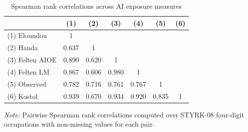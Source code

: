 \begin{table}[htbp]
\centering
\caption{Spearman rank correlations across AI exposure measures}
\label{tab:correlations}
\begin{tabular}{lcccccc}
\toprule
 & (1) & (2) & (3) & (4) & (5) & (6) \\
\midrule
(1) Eloundou & 1 &  &  &  &  &  \\
(2) Handa & 0.637 & 1 &  &  &  &  \\
(3) Felten AIOE & 0.890 & 0.620 & 1 &  &  &  \\
(4) Felten LM & 0.867 & 0.606 & 0.980 & 1 &  &  \\
(5) Observed & 0.782 & 0.716 & 0.761 & 0.767 & 1 &  \\
(6) Kostol & 0.939 & 0.670 & 0.934 & 0.920 & 0.835 & 1 \\
\bottomrule
\end{tabular}
\begin{minipage}{\textwidth}
\footnotesize\textit{Note:} Pairwise Spearman rank correlations computed over STYRK-08 four-digit occupations with non-missing values for each pair.
\end{minipage}
\end{table}
